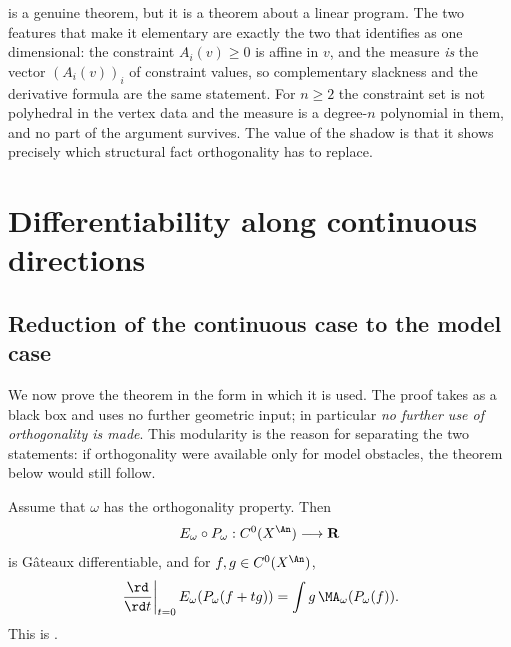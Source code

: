 \begin{remark}
\label{rem:ch27-shadow-scope}
 is a genuine theorem, but it is a theorem
about a linear program.  The two features that make it elementary are
exactly the two that
 identifies as one dimensional: the
constraint \(A_i(v)\geq0\) is affine in \(v\), and the measure \emph{is} the
vector \((A_i(v))_i\) of constraint values, so complementary slackness and
the derivative formula are the same statement.  For \(n\geq2\) the
constraint set is not polyhedral in the vertex data and the measure is a
degree-\(n\) polynomial in them, and no part of the argument survives.  The
value of the shadow is that it shows precisely which structural fact
orthogonality has to replace.
\end{remark}

\section{Differentiability along continuous directions}
\label{sec:ch27-continuous-directions}

\subsection{Reduction of the continuous case to the model case}
\label{sec:ch27-reduction}

We now prove the theorem in the form in which it is used.  The proof takes
 as a black box and uses no
further geometric input; in particular \emph{no further use of
orthogonality is made}.  This modularity is the reason for separating the
two statements: if orthogonality were available only for model obstacles,
the theorem below would still follow.

\begin{theorem}\label{thm:energy-envelope-differentiability}
Assume that \(\omega\) has the orthogonality property. Then
\[
                E_\omega\circ P_\omega:C^0(X^{\An})\longrightarrow\mathbf R
\]
is G\^ateaux differentiable, and for \(f,g\in C^0(X^{\An})\),
\begin{equation}\label{eq:energy-envelope-derivative}
 \left.\frac{\rd}{\rd t}\right|_{t=0}
 E_\omega(P_\omega(f+tg))
 =\int g\,\MA_\omega(P_\omega(f)).
\end{equation}
This is \cite[Theorem~7.2]{BFJ15}.
\end{theorem}

